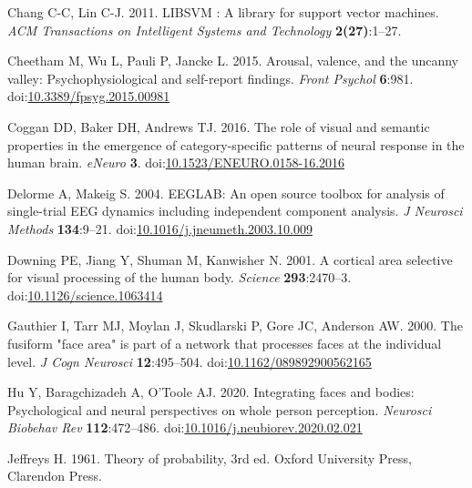 \documentclass[
]{article}
\newlength{\cslhangindent}
\newlength{\cslentryspacingunit} %
\newenvironment{CSLReferences}[2] %
 {%
  \setlength{\parindent}{0pt}
  \ifodd #1
  \let\oldpar\par
  \def\par{\hangindent=\cslhangindent\oldpar}
  \fi
  \setlength{\parskip}{#2\cslentryspacingunit}
 }%
 {}
\begin{document}
\hypertarget{refs}{}
\begin{CSLReferences}{1}{0}
\leavevmode{}%
Chang C-C, Lin C-J. 2011. {LIBSVM} : A library for support vector machines. \emph{ACM Transactions on Intelligent Systems and Technology} \textbf{2(27)}:1--27.

\leavevmode{}%
Cheetham M, Wu L, Pauli P, Jancke L. 2015. Arousal, valence, and the uncanny valley: Psychophysiological and self-report findings. \emph{Front Psychol} \textbf{6}:981. doi:\href{https://doi.org/10.3389/fpsyg.2015.00981}{10.3389/fpsyg.2015.00981}

\leavevmode{}%
Coggan DD, Baker DH, Andrews TJ. 2016. The role of visual and semantic properties in the emergence of category-specific patterns of neural response in the human brain. \emph{eNeuro} \textbf{3}. doi:\href{https://doi.org/10.1523/ENEURO.0158-16.2016}{10.1523/ENEURO.0158-16.2016}

\leavevmode{}%
Delorme A, Makeig S. 2004. {EEGLAB}: An open source toolbox for analysis of single-trial {EEG} dynamics including independent component analysis. \emph{J Neurosci Methods} \textbf{134}:9--21. doi:\href{https://doi.org/10.1016/j.jneumeth.2003.10.009}{10.1016/j.jneumeth.2003.10.009}

\leavevmode{}%
Downing PE, Jiang Y, Shuman M, Kanwisher N. 2001. A cortical area selective for visual processing of the human body. \emph{Science} \textbf{293}:2470--3. doi:\href{https://doi.org/10.1126/science.1063414}{10.1126/science.1063414}

\leavevmode{}%
Gauthier I, Tarr MJ, Moylan J, Skudlarski P, Gore JC, Anderson AW. 2000. The fusiform "face area" is part of a network that processes faces at the individual level. \emph{J Cogn Neurosci} \textbf{12}:495--504. doi:\href{https://doi.org/10.1162/089892900562165}{10.1162/089892900562165}

\leavevmode{}%
Hu Y, Baragchizadeh A, O'Toole AJ. 2020. Integrating faces and bodies: Psychological and neural perspectives on whole person perception. \emph{Neurosci Biobehav Rev} \textbf{112}:472--486. doi:\href{https://doi.org/10.1016/j.neubiorev.2020.02.021}{10.1016/j.neubiorev.2020.02.021}

\leavevmode{}%
Jeffreys H. 1961. Theory of probability, 3rd ed. Oxford University Press, Clarendon Press.


\end{CSLReferences}
\end{document}

